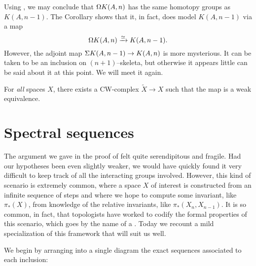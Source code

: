 \begin{remark}\label{ShiftingEMSpaces}
Using , we may conclude that $\Omega K(A, n)$ has the same homotopy groups as $K(A, n-1)$.
The Corollary shows that it, in fact, does model $K(A, n-1)$ via a map \[\Omega K(A, n) \xrightarrow\simeq K(A, n-1).\]
However, the adjoint map $\Sigma K(A, n-1) \to K(A, n)$ is more mysterious.
It can be taken to be an inclusion on $(n+1)$--skeleta, but otherwise it appears little can be said about it at this point.
We will meet it again.
\end{remark}

\begin{remark}
For \emph{all} spaces $X$, there exists a CW-complex $\widetilde X \to X$ such that the map is a weak equivalence.
\end{remark}




\section{Spectral sequences}

The argument we gave in the proof of  felt quite serendipitous and fragile.
Had our hypotheses been even slightly weaker, we would have quickly found it very difficult to keep track of all the interacting groups involved.
However, this kind of scenario is extremely common, where a space $X$ of interest is constructed from an infinite sequence of steps
and where we hope to compute some invariant, like $\pi_*(X)$, from knowledge of the relative invariants, like $\pi_*(X_n, X_{n-1})$.
It is so common, in fact, that topologists have worked to codify the formal properties of this scenario, which goes by the name of a .
Today we recount a mild specialization of this framework that will suit us well.

We begin by arranging into a single diagram the exact sequences associated to each inclusion:

